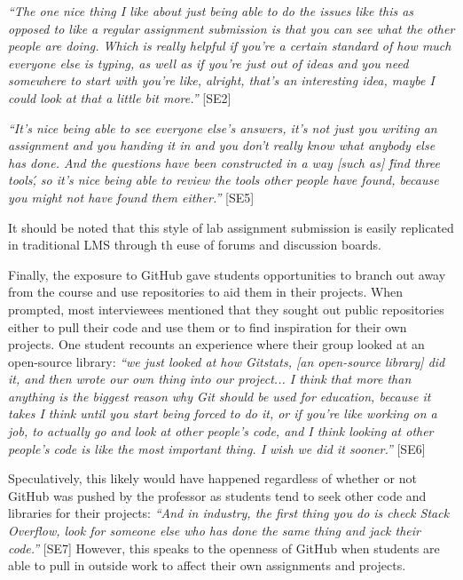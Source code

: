 \textit{``The one nice thing I like about just being able to do the issues like this as opposed to like a regular assignment submission is that you can see what the other people are doing. Which is really helpful if you're a certain standard of how much everyone else is typing, as well as if you're just out of ideas and you need somewhere to start with you're like, alright, that's an interesting idea, maybe I could look at that a little bit more.''} [SE2]

\textit{``It's nice being able to see everyone else's answers, it's not just you writing an assignment and you handing it in and you don't really know what anybody else has done. And the questions have been constructed in a way [such as] \'find three tools\', so it's nice being able to review the tools other people have found, because you might not have found them either.''} [SE5]

It should be noted that this style of lab assignment submission is easily replicated in traditional LMS through th euse of forums and discussion boards. %

Finally, the exposure to GitHub gave students opportunities to branch out away from the course and use repositories to aid them in their projects. When prompted, most interviewees mentioned that they sought out public repositories either to pull their code and use them or to find inspiration for their own projects. One student recounts an experience where their group looked at an open-source library: \textit{``we just looked at how Gitstats, [an open-source library] did it, and then wrote our own thing into our project... I think that more than anything is the biggest reason why Git should be used for education, because it takes I think until you start being forced to do it, or if you're like working on a job, to actually go and look at other people's code, and I think looking at other people's code is like the most important thing. I wish we did it sooner.''} [SE6]

Speculatively, this likely would have happened regardless of whether or not GitHub was pushed by the professor as students tend to seek other code and libraries for their projects: \textit{``And in industry, the first thing you do is check Stack Overflow, look for someone else who has done the same thing and jack their code.''} [SE7] However, this speaks to the openness of GitHub when students are able to pull in outside work to affect their own assignments and projects.

